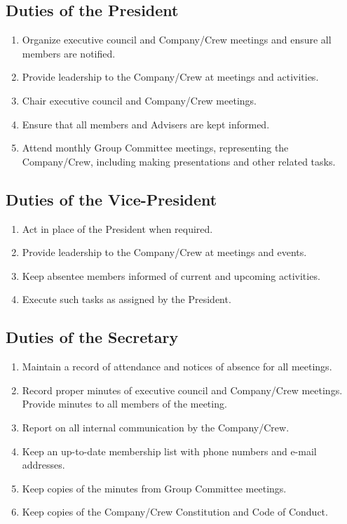 \documentclass{Service_Corps_Document}
\begin{document}
\subsection{Duties of the President}
\begin{enumerate}
	\item Organize executive council and Company/Crew meetings and ensure all members are notified.
	\item Provide leadership to the Company/Crew at meetings and activities. 
	\item Chair executive council and Company/Crew meetings.
	\item Ensure that all members and Advisers are kept informed.
	\item Attend monthly Group Committee meetings, representing the Company/Crew, including making presentations and other related tasks.
\end{enumerate}
\subsection{Duties of the Vice-President}
\begin{enumerate}
	\item Act in place of the President when required.
	\item Provide leadership to the Company/Crew at meetings and events. 
	\item Keep absentee members informed of current and upcoming activities.
	\item Execute such tasks as assigned by the President.
\end{enumerate}
\subsection{Duties of the Secretary}
\begin{enumerate}
	\item Maintain a record of attendance and notices of absence for all meetings.
	\item Record proper minutes of executive council and Company/Crew meetings. Provide minutes to all members of the meeting.
	\item Report on all internal communication by the Company/Crew.
	\item Keep an up-to-date membership list with phone numbers and e-mail addresses.
	\item Keep copies of the minutes from Group Committee meetings. 
	\item Keep copies of the Company/Crew Constitution and Code of Conduct.
\end{enumerate}
\end{document}
